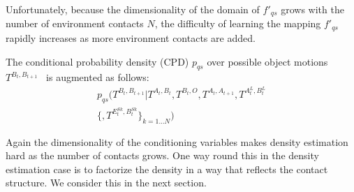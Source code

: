 \noindent Unfortunately, because the dimensionality of the domain of $f'_{qs}$ grows with the number of environment contacts $N$,
the difficulty of learning the mapping $f'_{qs}$ rapidly increases
as more environment contacts are added.


The conditional probability density (CPD) $p_{qs}$ over possible object motions $T^{B_{t}, B_{t+1}}$~\cite{kopicki_prediction_2009} is augmented as follows:
\begin{multline}
p_{qs}(T^{B_{t}, B_{t+1}} | T^{A_t, B_t}, T^{B_t, O}, T^{A_{t}, A_{t+1}}, T^{A^{L}_t, B^{L}_t}\\
\{, T^{E^{Sk}_t,B^{Sk}_t}\}_{k=1 \ldots N})
\label{eq:Learning.density}
\end{multline}

Again the dimensionality of the conditioning variables makes density
estimation hard as the number of contacts grows. One way round this in the density estimation case is to factorize the density in a way that
reflects the contact structure. We consider this in the next section. 